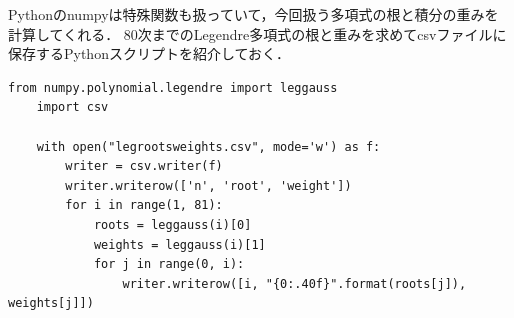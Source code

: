 \documentclass[a4j,papersize,disablejfam,slide,14pt]{jsarticle}
\begin{document}
    {\rm Python}の{\rm numpy}は特殊関数も扱っていて，今回扱う多項式の根と積分の重みを計算してくれる．
    $80$次までの{\rm Legendre}多項式の根と重みを求めて{\rm csv}ファイルに保存する{\rm Python}スクリプトを紹介しておく．
    \begin{lstlisting}[style=customPython]
    from numpy.polynomial.legendre import leggauss
	import csv
	
	with open("legrootsweights.csv", mode='w') as f:
    	writer = csv.writer(f)
    	writer.writerow(['n', 'root', 'weight'])
    	for i in range(1, 81):
        	roots = leggauss(i)[0]
        	weights = leggauss(i)[1]
        	for j in range(0, i):
            	writer.writerow([i, "{0:.40f}".format(roots[j]), weights[j]])
    
    \end{lstlisting}
\end{document}
